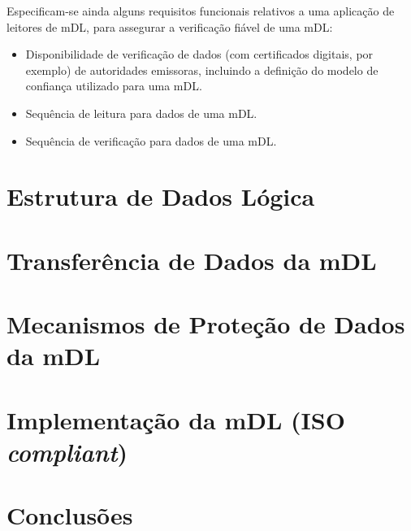 \documentclass[11pt]{article}
\begin{document}
Especificam-se ainda alguns requisitos funcionais relativos a uma aplicação de leitores de mDL, para assegurar a verificação fiável de uma mDL:

\begin{itemize}
	\item Disponibilidade de verificação de dados (com certificados digitais, por exemplo) de autoridades emissoras, incluindo a definição do modelo de confiança utilizado para uma mDL.
	\item Sequência de leitura para dados de uma mDL.
	\item Sequência de verificação para dados de uma mDL.
\end{itemize}


\section{Estrutura de Dados Lógica}


\section{Transferência de Dados da mDL}


\section{Mecanismos de Proteção de Dados da mDL}



\section{Implementação da mDL (ISO \textit{compliant})}


\section{Conclusões}




\end{document}
